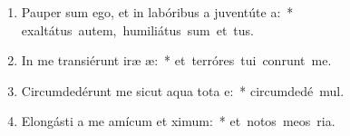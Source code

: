 \begin{flushleft}
\begin{enumerate}[leftmargin=*]
\item Pauper sum ego, et in labóribus a juventúte a:~* \mbox{exaltátus autem, humiliátus sum et tus.}
\item In me transiérunt iræ æ:~* \mbox{et terróres tui conrunt me.}
\item Circumdedérunt me sicut aqua tota e:~* \mbox{circumdedé  mul.}
\item Elongásti a me amícum et ximum:~* \mbox{et notos meos  ria.}



\end{enumerate}
\end{flushleft}

